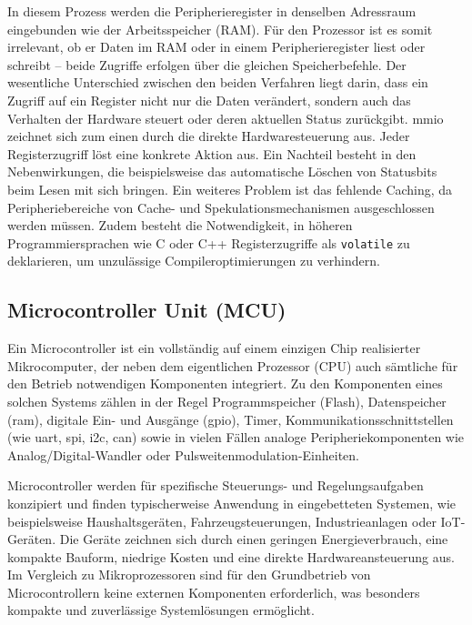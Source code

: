In diesem Prozess werden die Peripherieregister in denselben Adressraum eingebunden wie der Arbeitsspeicher (RAM). 
Für den Prozessor ist es somit irrelevant, ob er Daten im RAM oder in einem Peripherieregister liest oder schreibt – beide Zugriffe erfolgen über die gleichen Speicherbefehle. 
Der wesentliche Unterschied zwischen den beiden Verfahren liegt darin, dass ein Zugriff auf ein Register nicht nur die Daten verändert, sondern auch das Verhalten der Hardware steuert oder deren aktuellen Status zurückgibt.
\gls{mmio} zeichnet sich zum einen durch die direkte Hardwaresteuerung aus.
Jeder Registerzugriff löst eine konkrete Aktion aus.
Ein Nachteil besteht in den Nebenwirkungen, die beispielsweise das automatische Löschen von Statusbits beim Lesen mit sich bringen.
Ein weiteres Problem ist das fehlende Caching, da Peripheriebereiche von Cache- und Spekulationsmechanismen ausgeschlossen werden müssen. 
Zudem besteht die Notwendigkeit, in höheren Programmiersprachen wie C oder C++ Registerzugriffe als \texttt{volatile} zu deklarieren, um unzulässige Compileroptimierungen zu verhindern.


\subsection{Microcontroller Unit (MCU)}
Ein Microcontroller ist ein vollständig auf einem einzigen Chip realisierter Mikrocomputer, der neben dem eigentlichen Prozessor (CPU) auch sämtliche für den Betrieb notwendigen Komponenten integriert. 
Zu den Komponenten eines solchen Systems zählen in der Regel Programmspeicher (Flash), Datenspeicher (\gls{ram}), digitale Ein- und Ausgänge (\gls{gpio}), Timer, Kommunikationsschnittstellen (wie \gls{uart}, \gls{spi}, \gls{i2c}, \gls{can}) sowie in vielen Fällen analoge Peripheriekomponenten wie Analog/Digital-Wandler oder Pulsweitenmodulation-Einheiten.

Microcontroller werden für spezifische Steuerungs- und Regelungsaufgaben konzipiert und finden typischerweise Anwendung in eingebetteten Systemen, wie beispielsweise Haushaltsgeräten, Fahrzeugsteuerungen, Industrieanlagen oder IoT-Geräten. 
Die Geräte zeichnen sich durch einen geringen Energieverbrauch, eine kompakte Bauform, niedrige Kosten und eine direkte Hardwareansteuerung aus. 
Im Vergleich zu Mikroprozessoren sind für den Grundbetrieb von Microcontrollern keine externen Komponenten erforderlich, was besonders kompakte und zuverlässige Systemlösungen ermöglicht.


%




